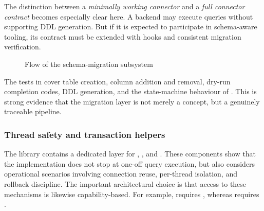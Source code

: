 The distinction between a \emph{minimally working connector} and a \emph{full connector contract} becomes especially clear here. A backend may execute queries without supporting DDL generation. But if it is expected to participate in schema-aware tooling, its contract must be extended with  hooks and consistent migration verification.

\begin{figure}[H]
\centering
{}
\caption{Flow of the schema-migration subsystem}
\label{fig:migration_pipeline}
\end{figure}

The tests in  cover table creation, column addition and removal, dry-run completion codes, DDL generation, and the state-machine behaviour of . This is strong evidence that the migration layer is not merely a concept, but a genuinely traceable pipeline.

\subsubsection{Thread safety and transaction helpers}

The library contains a dedicated layer for , , and . These components show that the implementation does not stop at one-off query execution, but also considers operational scenarios involving connection reuse, per-thread isolation, and rollback discipline. The important architectural choice is that access to these mechanisms is likewise capability-based. For example,  requires , whereas  requires .

